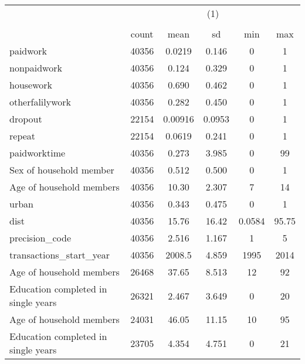 {
\def\sym#1{\ifmmode^{#1}\else\(^{#1}\)\fi}
\begin{tabular}{l*{1}{ccccc}}
\toprule
                    &\multicolumn{5}{c}{(1)}                                         \\
                    &\multicolumn{5}{c}{}                                            \\
                    &       count&        mean&          sd&         min&         max\\
\midrule
paidwork            &       40356&      0.0219&       0.146&           0&           1\\
nonpaidwork         &       40356&       0.124&       0.329&           0&           1\\
housework           &       40356&       0.690&       0.462&           0&           1\\
otherfalilywork     &       40356&       0.282&       0.450&           0&           1\\
dropout             &       22154&     0.00916&      0.0953&           0&           1\\
repeat              &       22154&      0.0619&       0.241&           0&           1\\
paidworktime        &       40356&       0.273&       3.985&           0&          99\\
Sex of household member&       40356&       0.512&       0.500&           0&           1\\
Age of household members&       40356&       10.30&       2.307&           7&          14\\
urban               &       40356&       0.343&       0.475&           0&           1\\
dist                &       40356&       15.76&       16.42&      0.0584&       95.75\\
precision\_code      &       40356&       2.516&       1.167&           1&           5\\
transactions\_start\_year&       40356&      2008.5&       4.859&        1995&        2014\\
Age of household members&       26468&       37.65&       8.513&          12&          92\\
Education completed in single years&       26321&       2.467&       3.649&           0&          20\\
Age of household members&       24031&       46.05&       11.15&          10&          95\\
Education completed in single years&       23705&       4.354&       4.751&           0&          21\\
\bottomrule
\end{tabular}
}
